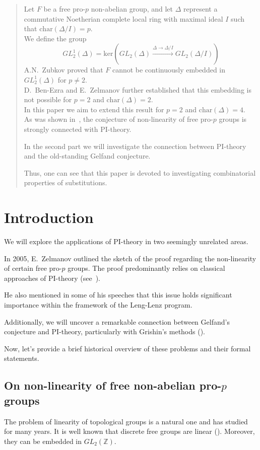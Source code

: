\documentclass[12pt,a4paper]{article}
\begin{document}
    \begin{abstract}
        Let $F$ be a free pro-$p$ non-abelian group, and let $\Delta$ represent a commutative Noetherian complete local ring with maximal ideal $I$ such that
        $\mathrm{char}(\Delta/I)=p$.\\
        We define the group
        \[GL_2^1(\Delta) = \mathrm{ker}\left( GL_2(\Delta) \xrightarrow{\Delta\to\Delta/I} GL_2(\Delta/I) \right)\]
        A.N.\ Zubkov proved that $F$ cannot be continuously embedded in $GL_2^1(\Delta)$ for $p\neq 2$.\\
        D.\ Ben-Ezra and E.\ Zelmanov further established that this embedding is not possible for $p = 2$ and $\mathrm{char}(\Delta) = 2$.\\
        In this paper we aim to extend this result for $p=2$ and $\mathrm{char}(\Delta)=4$.\\
        As was shown in~\cite{Zelmanov1}, the conjecture of non-linearity of free pro-$p$ groups is strongly connected with PI-theory.

        In the second part we will investigate the connection between PI-theory and the old-standing Gelfand conjecture.

        Thus, one can see that this paper is devoted to investigating combinatorial properties of substitutions.
    \end{abstract}


    \section{Introduction}

    We will explore the applications of PI-theory in two seemingly unrelated areas.

    In 2005, E.\ Zelmanov outlined the sketch of the proof regarding the non-linearity of certain free pro-$p$ groups.
    The proof predominantly relies on classical approaches of PI-theory (see~\cite{Zelmanov1}).

    He also mentioned in some of his speeches that this issue holds significant importance within the framework of the Leng-Lenz program.

    Additionally, we will uncover a remarkable connection between Gelfand's conjecture and PI-theory, particularly with Grishin's methods (\cite{Grishin}).

    Now, let's provide a brief historical overview of these problems and their formal statements.

    \subsection{On non-linearity of free non-abelian pro-$p$ groups}
    The problem of linearity of topological groups is a natural one and has studied for many years.
    It is well known that discrete free groups are linear (\cite{Sanov}).
    Moreover, they can be embedded in $GL_2(\mathbb{Z})$.
\end{document}
